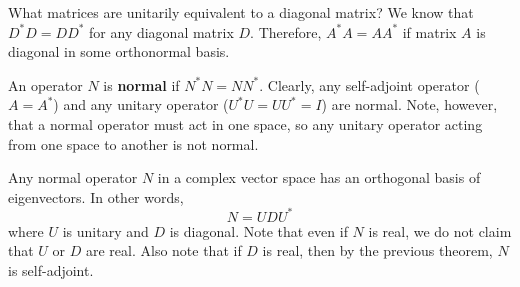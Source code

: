 What matrices are unitarily equivalent to a diagonal matrix? We know that $D^{*} D = DD^{*}$ for any diagonal matrix $D$. Therefore, $A^{*} A = AA^{*}$ if matrix $A$ is diagonal in some orthonormal basis. 

\begin{definition}
An operator $N$ is \textbf{normal} if $N^{*}N = NN^{*}$. Clearly, any self-adjoint operator ($A = A^{*}$) and any unitary operator ($U^{*}U = UU^{*} = I$) are normal. Note, however, that a normal operator must act in one space, so any unitary operator acting from one space to another is not normal. 
\end{definition}

\begin{theorem}
Any normal operator $N$ in a complex vector space has an orthogonal basis of eigenvectors. In other words, 
$$N = UDU^{*}$$
where $U$ is unitary and $D$ is diagonal. Note that even if $N$ is real, we do not claim that $U$ or $D$ are real. Also note that if $D$ is real, then by the previous theorem, $N$ is self-adjoint. 
\end{theorem}

